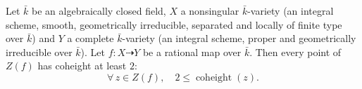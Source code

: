 \begin{theorem}
  \label{pa-thm:indeterminacy_codimGe2}
  \leanok

  Let \(\bar k\) be an algebraically closed field, \(X\) a nonsingular
  \(\bar k\)-variety (an integral scheme, smooth, geometrically irreducible,
  separated and locally of finite type over \(\bar k\)) and \(Y\) a complete
  \(\bar k\)-variety (an integral scheme, proper and geometrically irreducible
  over \(\bar k\)). Let \(f : X \dashrightarrow Y\) be a rational map over
  \(\bar k\). Then every point of \(Z(f)\) has coheight at least \(2\):
  \[
    \forall\, z \in Z(f), \quad 2 \leq \operatorname{coheight}(z).
  \]
\end{theorem}
